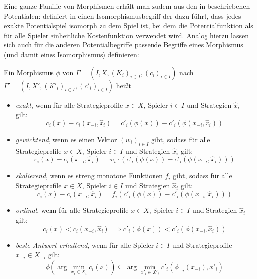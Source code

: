 Eine ganze Familie von Morphismen erhält man zudem aus den in  beschriebenen Potentialen: \citeauthor{ReprOfFiniteGamesAsNCG} definiert in \cite{ReprOfFiniteGamesAsNCG} einen Isomorphismusbegriff der dazu führt, dass jedes exakte Potentialspiel isomorph zu dem Spiel ist, bei dem die Potentialfunktion als für alle Spieler einheitliche Kostenfunktion verwendet wird. Analog hierzu lassen sich auch für die anderen Potentialbegriffe passende Begriffe eines Morphismus (und damit eines Isomorphismus) definieren:

\begin{defn}\label{def:PotentialMorphismen}
	Ein Morphismus $\phi$ von $\Gamma = (I, X, (K_i)_{i\in I}, (c_i)_{i\in I})$ nach $\Gamma' = (I, X', (K'_i)_{i\in I}, (c'_i)_{i\in I})$ heißt
	\begin{itemize}
		\item \emph{exakt}, wenn für alle Strategieprofile $x \in X$, Spieler $i \in I$ und Strategien $\hat{x}_i$ gilt:
			\[c_i(x) - c_i(x_{-i}, \hat{x}_i) = c'_i(\phi(x)) - c'_i(\phi(x_{-i}, \hat{x}_i))\]
		\item \emph{gewichtend}, wenn es einen Vektor $(w_i)_{i \in I}$ gibt, sodass für alle Strategieprofile $x \in X$, Spieler $i \in I$ und Strategien $\hat{x}_i$ gilt:
			\[c_i(x) - c_i(x_{-i}, \hat{x}_i) = w_i\cdot\left(c'_i(\phi(x)) - c'_i(\phi(x_{-i}, \hat{x}_i))\right)\]
		\item \emph{skalierend}, wenn es streng monotone Funktionen $f_i$ gibt, sodass für alle Strategieprofile $x \in X$, Spieler $i \in I$ und Strategien $\hat{x}_i$ gilt:
			\[c_i(x) - c_i(x_{-i}, \hat{x}_i) = f_i(c'_i(\phi(x)) - c'_i(\phi(x_{-i}, \hat{x}_i)))\]
		\item \emph{ordinal}, wenn für alle Strategieprofile $x \in X$, Spieler $i \in I$ und Strategien $\hat{x}_i$ gilt:
			\[c_i(x) < c_i(x_{-i}, \hat{x}_i) \implies c'_i(\phi(x)) < c'_i(\phi(x_{-i}, \hat{x}_i))\]
		\item \emph{beste Antwort-erhaltend}, wenn für alle Spieler $i \in I$ und Strategieprofile $x_{-i} \in X_{-i}$ gilt:
			\[\phi(\arg \min_{x_i \in X_i}c_i(x)) \subseteq \arg \min_{x'_i \in X'_i} c'_i(\phi_{-i}(x_{-i}), x'_i)\]
	\end{itemize}	
\end{defn}



